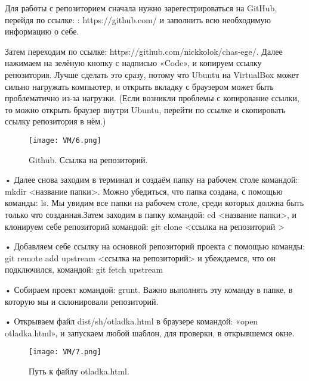 Для работы с репозиторием сначала нужно зарегестрироваться на GitHub, перейдя по ссылке: : https://github.com/ и заполнить всю необходимую информацию о себе.

Затем переходим по ссылке: https://github.com/nickkolok/chas-ege/. Далее нажимаем на зелёную кнопку с надписью «Code», и копируем ссылку репозитория. Лучше сделать это сразу, потому что Ubuntu на VirtualBox может сильно нагружать компьютер, и открыть вкладку с браузером может быть проблематично из-за нагрузки. (Если возникли проблемы с копирование ссылки, то можно открыть браузер внутри Ubuntu, перейти по ссылке и скопировать ссылку репозитория в нём.)

\begin{figure}[h]
		\centering
		\texttt{[image: VM/6.png]}
\caption{Github. Ссылка на репозиторий.}
\label{ris:image}
\end{figure}

• Далее снова заходим в терминал и создаём папку на рабочем столе командой: mkdir <название папки>. Можно убедиться, что папка создана, с помощью команды: ls. Мы увидим все папки на рабочем столе, среди которых должна быть только что созданная.Затем заходим в папку командой: cd <название папки>, и клонируем себе репозиторий командой: git clone <ссылка на репозиторий >

• Добавляем себе ссылку на основной репозиторий проекта с помощью команды: git remote add upstream <ссылка на репозиторий> и убеждаемся, что он подключился, командой: git fetch upstream 

• Собираем проект командой: grunt. Важно выполнять эту команду в папке, в которую мы и склонировали репозиторий.

• Открываем файл dist/sh/otladka.html в браузере командой: «open otladka.html», и запускаем любой шаблон, для проверки, в открывшемся окне.


\begin{figure}[h]
		\centering
		\texttt{[image: VM/7.png]}
\caption{Путь к файлу otladka.html.}
\label{ris:image}
\end{figure}